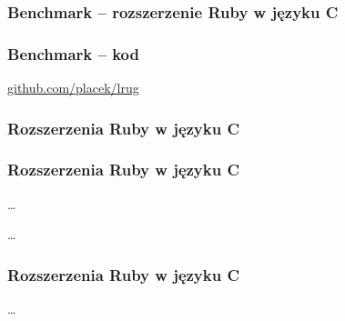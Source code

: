 \documentclass{beamer}
\begin{document}
  \begin{frame}
    \frametitle{Benchmark -- rozszerzenie Ruby w języku C}
    \begin{center}
      
    \end{center}
  \end{frame}

  \begin{frame}
    \frametitle{Benchmark -- kod}
    \begin{center}
      \href{https://github.com/placek/lrug/tree/master/ruby\_extensions\_in\_c/example}{github.com/placek/lrug}
    \end{center}
  \end{frame}

  \begin{frame}
    \frametitle{Rozszerzenia Ruby w języku C}
    
  \end{frame}

  \begin{frame}
    \frametitle{Rozszerzenia Ruby w języku C}
    
    \ldots
    
    \ldots
    
  \end{frame}

  \begin{frame}
    \frametitle{Rozszerzenia Ruby w języku C}
    
    \ldots
  \end{frame}
\end{document}
